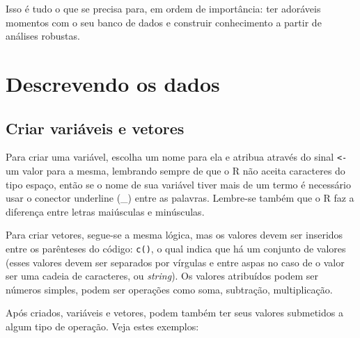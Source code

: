 \documentclass[
  10pt,
  brazil,
  a4paper,
  twoside, notitlepage, openright]{book}
\begin{document}
Isso é tudo o que se precisa para, em ordem de importância: ter adoráveis momentos com o seu banco de dados e construir conhecimento a partir de análises robustas.

\hypertarget{descrevendo-os-dados}{%
\section{Descrevendo os dados}\label{descrevendo-os-dados}}

\hypertarget{criar-variuxe1veis-e-vetores}{%
\subsection{Criar variáveis e vetores}\label{criar-variuxe1veis-e-vetores}}

Para criar uma variável, escolha um nome para ela e atribua através do sinal \texttt{\textless{}-} um valor para a mesma, lembrando sempre de que o R não aceita caracteres do tipo espaço, então se o nome de sua variável tiver mais de um termo é necessário usar o conector underline (\_) entre as palavras. Lembre-se também que o R faz a diferença entre letras maiúsculas e minúsculas.

Para criar vetores, segue-se a mesma lógica, mas os valores devem ser inseridos entre os parênteses do código: \texttt{c()}, o qual indica que há um conjunto de valores (esses valores devem ser separados por vírgulas e entre aspas no caso de o valor ser uma cadeia de caracteres, ou \emph{string}). Os valores atribuídos podem ser números simples, podem ser operações como soma, subtração, multiplicação.

Após criados, variáveis e vetores, podem também ter seus valores submetidos a algum tipo de operação. Veja estes exemplos:
\end{document}
